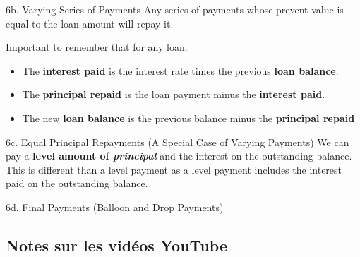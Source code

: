 \begin{CHPT_SUMM_AUTO}[label = {L.-6b}]{6b. Varying Series of Payments}
Any series of payments whose prevent value is equal to the loan amount will repay it.

Important to remember that for any loan:
\begin{itemize}
	\item	The \textbf{interest paid} is the interest rate times the previous \textbf{loan balance}.
	\item	The \textbf{principal repaid} is the loan payment minus the \textbf{interest paid}.
	\item	The new \textbf{loan balance} is the previous balance minus the \textbf{principal repaid}
\end{itemize}
\end{CHPT_SUMM_AUTO}

\begin{CHPT_SUMM_AUTO}[label = {L.-6c}]{6c. Equal Principal Repayments (A Special Case of Varying Payments)}
We can pay a \textbf{level amount of \textit{principal}} and the interest on the outstanding balance. This is different than a level payment as a level payment includes the interest paid on the outstanding balance.
\end{CHPT_SUMM_AUTO}
%
\begin{CHPT_SUMM_AUTO}[label = {L.-6d}]{6d. Final Payments (Balloon and Drop Payments)}

\end{CHPT_SUMM_AUTO}

\subsection{Notes sur les vidéos YouTube}

